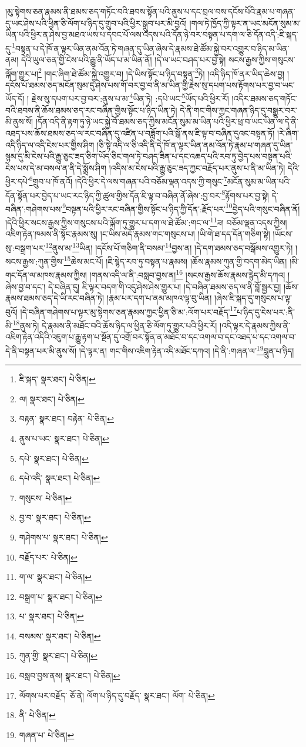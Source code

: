 །མུ་སྟེགས་ཅན་རྣམས་ནི་ཐམས་ཅད་གཏོང་བའི་ཐབས་སྟོན་པའི་ནུས་པ་དང་བྲལ་བས་དངོས་པོའི་རྣམ་པ་གཞན་དུ་ཡང་ཤེས་པའི་ཕྱིན་ཅི་ལོག་པ་ཉིད་དུ་གྲུབ་པའི་ཕྱིར་སྒྲུབ་པར་མི་བྱའོ། །གལ་ཏེ་ཁྱོད་ཀྱི་ལྟར་ན་ཡང་མངོན་སུམ་མ་ཡིན་པའི་ཕྱིར་ན་ཤེས་བྱ་མཐའ་ཡས་པ་དབང་པོ་ལས་འདས་པའི་དོན་ཉེ་བར་བསྟན་པ་དག་ལ་ཅི་དོན་འདི་:ཇི་སྐད་དུ་\footnote{ཇི་སྐད་  སྣར་ཐང་།  པེ་ཅིན། }བསྟན་པ་དེ་ཁོ་ན་ལྟར་ཡིན་ནམ་འོན་ཏེ་གཞན་དུ་ཡིན་ཞེས་དེ་རྣམས་ཐེ་ཚོམ་སྐྱེ་བར་འགྱུར་བ་ཉིད་མ་ཡིན་ནམ། དེའི་ཡུལ་ཅན་གྱི་ངེས་པའི་རྒྱུ་ནི་ཡོད་པ་མ་ཡིན་ནོ། །དེ་ལ་ཡང་བཤད་པར་བྱ་སྟེ། སངས་རྒྱས་ཀྱིས་གསུངས་ལྐོག་གྱུར་པ།\footnote{ལ།  སྣར་ཐང་།  པེ་ཅིན། } །གང་ཞིག་ཐེ་ཚོམ་སྐྱེ་འགྱུར་བ། །དེ་ཡིས་སྟོང་པ་ཉིད་བསྟན་\footnote{བརྟན་  སྣར་ཐང་། བརྟེན་  པེ་ཅིན། }ཏེ། །འདི་ཉིད་ཁོ་ནར་ཡིད་ཆེས་བྱ། །དངོས་པོ་ཐམས་ཅད་མངོན་སུམ་དུ་ཤེས་པས་གོ་བར་བྱ་བ་ནི་མ་ཡིན་གྱི་རྗེས་སུ་དཔག་པས་རྟོགས་པར་བྱ་བ་ཡང་ཡོད་དོ། །
རྗེས་སུ་དཔག་པར་བྱ་བར་:ནུས་པ་མ་\footnote{ནུས་པ་ཡང་  སྣར་ཐང་།  པེ་ཅིན། }ཡིན་ཏེ། :དཔེ་ཡང་\footnote{དཔེ་  སྣར་ཐང་།  པེ་ཅིན། }ཡོད་པའི་ཕྱིར་རོ། །འདིར་ཐམས་ཅད་གཏོང་བའི་ཐབས་ནི་ཆོས་ཐམས་ཅད་རང་བཞིན་གྱིས་སྟོང་པ་ཉིད་ཡིན་ཏེ། དེ་ནི་གང་གིས་ཀྱང་གཞན་ཉིད་དུ་བསྒྱུར་བར་མི་ནུས་སོ། །དོན་འདི་ནི་རྟག་ཏུ་ཉེ་ཡང་སྐྱེ་བོ་ཐམས་ཅད་ཀྱིས་མངོན་སུམ་མ་ཡིན་པའི་ཕྱིར་ཕྲ་བ་ཡང་ཡིན་ལ་དེ་ནི་འཐད་པས་ཆོས་ཐམས་ཅད་ལ་རང་བཞིན་དུ་འཛིན་པ་བཟློག་པའི་སྒོ་ནས་ཇི་ལྟ་བ་བཞིན་དུའང་བསྟན་ཏོ། །རེ་ཞིག་འདི་ཉིད་ལ་འདི་ངེས་པར་གྱིས་ཤིག །ཅི་སྟེ་འདི་ལ་ཅི་འདི་ནི་དེ་ཁོ་ན་ལྟར་ཡིན་ནམ་འོན་ཏེ་རྣམ་པ་གཞན་དུ་ཡིན་སྙམ་དུ་མི་ངེས་པའི་རྒྱུ་ཅུང་ཟད་ཅིག་ཡོད་ཅིང་གལ་ཏེ་བཤད་ཟིན་པ་དང་འཆད་པའི་རབ་ཏུ་བྱེད་པས་བསྟན་པའི་ངེས་པས་དེ་མ་བསལ་ན་ནི་དེ་སྨྲོས་ཤིག །འདིས་མ་ངེས་པའི་རྒྱུ་ཅུང་ཟད་ཀྱང་བརྗོད་པར་ནུས་པ་ནི་མ་ཡིན་ཏེ། དེའི་ཕྱིར་དཔེ་\footnote{དཔེ་འདི་  སྣར་ཐང་།  པེ་ཅིན། }གྲུབ་པ་ཁོ་ནའོ། །དེའི་ཕྱིར་དེ་ལས་གཞན་པའི་བཅོམ་ལྡན་འདས་ཀྱི་གསུང་\footnote{གསུངས་  པེ་ཅིན། }མངོན་སུམ་མ་ཡིན་པའི་དོན་སྟོན་པར་བྱེད་པ་ཡང་རང་ཉིད་ཀྱི་ཚུལ་གྱིས་དོན་ཇི་ལྟ་བ་བཞིན་ནོ་ཞེས་:བྱ་བར་\footnote{བྱ་བ་  སྣར་ཐང་།  པེ་ཅིན། }རྟོགས་པར་བྱ་སྟེ། དེ་བཞིན་:གཤེགས་པས་\footnote{གཤེགས་པ་  སྣར་ཐང་།  པེ་ཅིན། }བསྟན་པའི་ཕྱིར་རང་བཞིན་གྱིས་སྟོང་པ་ཉིད་ཀྱི་དོན་:རྗོད་པར་\footnote{བརྗོད་པར་  པེ་ཅིན། }བྱེད་པའི་གསུང་བཞིན་ནོ། །དེའི་ཕྱིར་སངས་རྒྱས་ཀྱིས་གསུངས་པའི་ལྐོག་ཏུ་གྱུར་པ་དག་ལ་ཐེ་ཚོམ་:གང་ལ་\footnote{ག་ལ་  སྣར་ཐང་།  པེ་ཅིན། }ཟ། བཅོམ་ལྡན་འདས་ཀྱིས། འཇིག་རྟེན་ཁམས་ནི་སྟོང་རྣམས་སུ། །ང་ཡིས་མདོ་རྣམས་གང་གསུངས་པ། །ཡི་གེ་ཐ་དད་དོན་གཅིག་སྟེ། །ཡོངས་སུ་:བསྒྲག་པར་\footnote{བསྒྲག་པ་  སྣར་ཐང་།  པེ་ཅིན། }ནུས་མ་\footnote{པ་  སྣར་ཐང་།  པེ་ཅིན། }ཡིན། །དངོས་པོ་གཅིག་ནི་བསམ་\footnote{བསམས་  སྣར་ཐང་།  པེ་ཅིན། }བྱས་ན། །དེ་དག་ཐམས་ཅད་བསྒོམས་འགྱུར་ཏེ། །སངས་རྒྱས་:ཀུན་གྱིས་\footnote{ཀུན་གྱི་  སྣར་ཐང་།  པེ་ཅིན། }ཆེས་མང་པོ། །ཇི་སྙེད་རབ་ཏུ་བསྟན་པ་རྣམས། །ཆོས་རྣམས་ཀུན་གྱི་བདག་མེད་ཡིན། །མི་གང་དོན་ལ་མཁས་རྣམས་ཀྱིས། །གནས་འདི་ལ་ནི་:བསླབ་བྱས་ན།\footnote{བསླབ་བྱས་ནས།  སྣར་ཐང་།  པེ་ཅིན། } །སངས་རྒྱས་ཆོས་རྣམས་རྙེད་མི་དཀའ། །ཞེས་བྱ་བ་དང་། དེ་བཞིན་དུ། ཇི་ལྟར་བདག་གི་འདུ་ཤེས་ཤེས་གྱུར་པ། །དེ་བཞིན་ཐམས་ཅད་ལ་ནི་བློ་སྦྱར་བྱ། །ཆོས་རྣམས་ཐམས་ཅད་དེ་ཡི་རང་བཞིན་ཏེ། །རྣམ་པར་དག་པ་ནམ་མཁའ་ལྟ་བུ་ཡིན། །ཞེས་ཇི་སྐད་དུ་གསུངས་པ་ལྟ་བུའོ། །དེ་བཞིན་གཤེགས་པ་ལྟར་མུ་སྟེགས་ཅན་རྣམས་ཀྱང་ཕྱིན་ཅི་མ་:ལོག་པར་བརྗོད་\footnote{ལོགས་པར་བརྗོད་  ཅོ་ནེ། ལོག་པ་ཉིད་དུ་བརྗོད་  སྣར་ཐང་། ལོག་  པེ་ཅིན། }པ་ཉིད་དུ་ངེས་པར་:ནི་མི་\footnote{ནི་  པེ་ཅིན། }ནུས་ཏེ། དེ་རྣམས་ནི་མཐོང་བའི་ཆོས་ཉིད་ལ་ཕྱིན་ཅི་ལོག་ཏུ་གྱུར་པའི་ཕྱིར་རོ། །འདི་ལྟར་དེ་རྣམས་ཀྱིས་ནི་འཇིག་རྟེན་འདིའི་འཇུག་པ་རྒྱུ་རྟག་པ་སྔོན་དུ་འགྲོ་བར་སྟོན་ན་མཐོང་བ་དང་འགལ་བ་དང་འཐད་པ་དང་འགལ་བ་དེ་ནི་བསྟན་པར་མི་ནུས་སོ། །དེ་ལྟར་ན། གང་གིས་འཇིག་རྟེན་འདི་མཐོང་དཀའ། །དེ་ནི་:གཞན་ལ་\footnote{གཞན་པ་  པེ་ཅིན། }བླུན་པ་ཉིད། 